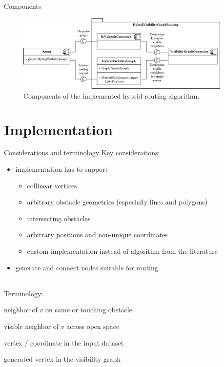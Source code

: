 \documentclass[xcolor={x11names}]{beamer}
\renewcommand{\n}{\hfill\\[0.5ex]}
\newcommand{\nn}{\hfill\\[2ex]}
\newenvironment{figcenter}
{%
	\parskip=0pt%
	\par%
	\nopagebreak%
	\centering%
}%
{%
	\par%
	\noindent%
	\ignorespacesafterend%
}
\begin{document}
		\begin{frame}{Components}
			\begin{figure}[t]
				\begin{figcenter}
					\includegraphics[width=0.95\textwidth]{images/components.pdf}
				\end{figcenter}
				\caption{Components of the implemented hybrid routing algorithm.}
			\end{figure}
		\end{frame}
	
	\section{Implementation}
	
		\begin{frame}{Considerations and terminology}
			Key considerations:\n
			\begin{itemize}
				\item implementation has to support
				\begin{itemize}
					\item collinear vertices
					\item arbitrary obstacle geometries (especially lines and polygons)
					\item intersecting obstacles
					\item arbitrary positions and non-unique coordinates
					\item[\textrightarrow] custom implementation instead of algorithm from the literature
				\end{itemize}
				\item generate and connect nodes suitable for routing
			\end{itemize}
			\nn
			\pause
			Terminology:\n
			\begin{description}
				\item[obstacle neighbor] neighbor of $v$ on same or touching obstacle
				\item[visibility neighbor] visible neighbor of $v$ across open space
				\item[input vertex] vertex / coordinate in the input dataset
				\item[output vertex] generated vertex in the visibility graph
			\end{description}
		\end{frame}
		
\end{document}
